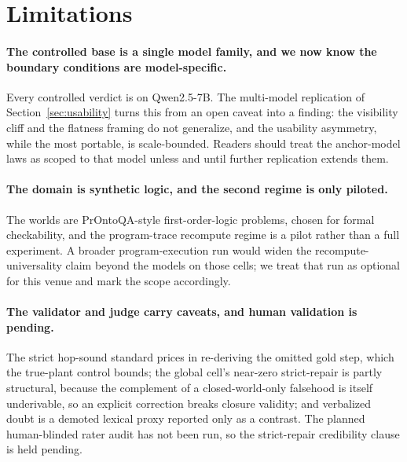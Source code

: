\section{Limitations}
\label{sec:limitations}


\paragraph{The controlled base is a single model family, and we now know the
boundary conditions are model-specific.} Every controlled verdict is on
Qwen2.5-7B. The multi-model replication of Section~\ref{sec:usability} turns
this from an open caveat into a finding: the visibility cliff and the
flatness framing do not generalize, and the usability asymmetry, while the
most portable, is scale-bounded. Readers should treat the anchor-model laws
as scoped to that model unless and until further replication extends them.

\paragraph{The domain is synthetic logic, and the second regime is only
piloted.} The worlds are PrOntoQA-style first-order-logic problems, chosen
for formal checkability, and the program-trace recompute regime is a pilot
rather than a full experiment. A broader program-execution run would widen
the recompute-universality claim beyond the models on those cells; we treat
that run as optional for this venue and mark the scope accordingly.

\paragraph{The validator and judge carry caveats, and human validation is
pending.} The strict hop-sound standard prices in re-deriving the omitted
gold step, which the true-plant control bounds; the global cell's near-zero
strict-repair is partly structural, because the complement of a
closed-world-only falsehood is itself underivable, so an explicit correction
breaks closure validity; and verbalized doubt is a demoted lexical proxy
reported only as a contrast.
The planned human-blinded rater audit has not been run, so the
strict-repair credibility clause is held pending. 

